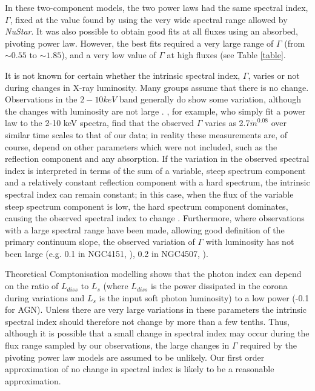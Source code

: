 \documentclass[useAMS,usenatbib]{sam}
\begin{document}
In these two-component models, the two power laws had the same spectral index, $\Gamma$, fixed at the value found by \citet{risaliti13} using the very wide spectral
range allowed by {\it NuStar}. It was also possible to obtain good fits at all fluxes using an absorbed, pivoting power law. However, the best fits required a very large
range of $\Gamma$ (from $\sim 0.55$ to $\sim 1.85$), and a very low value of $\Gamma$ at high fluxes (see Table \ref{table}.

It is not known for certain whether the intrinsic spectral index, $\Gamma$, varies or not during changes in X-ray luminosity. Many groups 
\citep[e.g.][]{miller08,turner07,fabian05,pounds04} assume that there is no change. Observations in the $2-10 keV$ band generally do show some
variation, although the changes with luminosity are not large  \citep[e.g.][]{sobolewska,zdziarski99}. \citet{sobolewska}, for example, who simply fit a power
law to the 2-10 keV spectra, find that the observed $\Gamma$ varies as 2.7$\dot m ^{0.08}$ over similar time scales to that of our data; in reality these measurements
are, of course, depend on other parameters which were not included, such as the reflection component and any absorption. If the variation in the observed spectral index
is interpreted in terms of the sum of a variable, steep spectrum component and a relatively constant reflection component with a hard spectrum, the intrinsic spectral
index can remain constant; in this case, when the flux of the variable steep spectrum component is low, the hard spectrum component dominates, causing the observed
spectral index to change  \citep[e.g.][]{guainazzi99,uttley99,ponti,fabian03}. Furthermore, where observations with a large spectral range have been
made, allowing good definition of the primary continuum slope, the observed variation of $\Gamma$ with luminosity has not been large (e.g. 0.1 in NGC4151,
\citealt{lubinski10}), 0.2 in NGC4507, \citealt{braito}).

Theoretical Comptonisation modelling  \citep[e.g.][]{beloborodov99,coppi92} shows that the photon index can depend on the ratio of $L_{diss}$ to $L_s$ (where
$L_{diss}$ is the power dissipated in the corona during variations and $L_s$ is the input soft photon luminosity) to a low power (-0.1 for AGN). Unless there are very
large variations in these parameters the intrinsic spectral index should therefore not change by more than a few tenths. Thus, although it is possible that a small change
in spectral index may occur during the flux range sampled by our observations, the large changes in $\Gamma$ required by the pivoting power law models are assumed to
be unlikely. Our first order approximation of no change in spectral index is likely to be a reasonable approximation. 
\end{document}
